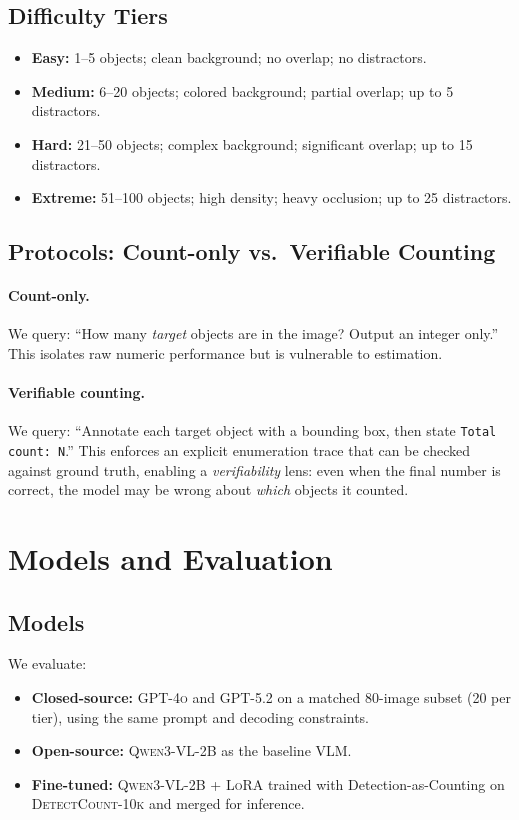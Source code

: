 \documentclass[10pt]{article}
\newcommand{\trainset}{\textsc{DetectCount-10k}\xspace}   %
\newcommand{\gptfour}{\textsc{GPT-4o}\xspace}
\newcommand{\gptfive}{\textsc{GPT-5.2}\xspace}
\newcommand{\qwenbase}{\textsc{Qwen3-VL-2B}\xspace}
\newcommand{\qwenft}{\textsc{Qwen3-VL-2B + LoRA}\xspace}
\begin{document}
\subsection{Difficulty Tiers}
\begin{itemize}[leftmargin=1.2em]
  \item \textbf{Easy:} 1--5 objects; clean background; no overlap; no distractors.
  \item \textbf{Medium:} 6--20 objects; colored background; partial overlap; up to 5 distractors.
  \item \textbf{Hard:} 21--50 objects; complex background; significant overlap; up to 15 distractors.
  \item \textbf{Extreme:} 51--100 objects; high density; heavy occlusion; up to 25 distractors.
\end{itemize}

\subsection{Protocols: Count-only vs.\ Verifiable Counting}
\paragraph{Count-only.}
We query: ``How many \emph{target} objects are in the image? Output an integer only.''
This isolates raw numeric performance but is vulnerable to estimation.

\paragraph{Verifiable counting.}
We query: ``Annotate each target object with a bounding box, then state \texttt{Total count: N}.''  
This enforces an explicit enumeration trace that can be checked against ground truth, enabling a \emph{verifiability} lens:
even when the final number is correct, the model may be wrong about \emph{which} objects it counted.

\section{Models and Evaluation}
\subsection{Models}
We evaluate:
\begin{itemize}[leftmargin=1.2em]
  \item \textbf{Closed-source:} \gptfour and \gptfive on a matched 80-image subset (20 per tier), using the same prompt and decoding constraints.
  \item \textbf{Open-source:} \qwenbase as the baseline VLM.
  \item \textbf{Fine-tuned:} \qwenft trained with Detection-as-Counting on \trainset and merged for inference.
\end{itemize}
\end{document}
